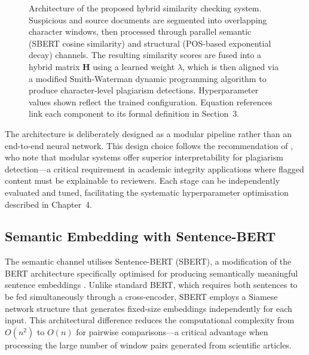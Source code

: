 \documentclass[12pt, a4paper]{article}
\begin{document}
\begin{figure}[htbp]
{%
	}%
	\caption{Architecture of the proposed hybrid similarity checking system. Suspicious and source documents are segmented into overlapping character windows, then processed through parallel semantic (SBERT cosine similarity) and structural (POS-based exponential decay) channels. The resulting similarity scores are fused into a hybrid matrix $\mathbf{H}$ using a learned weight $\lambda$, which is then aligned via a modified Smith-Waterman dynamic programming algorithm to produce character-level plagiarism detections. Hyperparameter values shown reflect the trained configuration. Equation references link each component to its formal definition in Section~3.}
	\label{fig:architecture}
\end{figure}

The architecture is deliberately designed as a modular pipeline rather than an end-to-end neural network. This design choice follows the recommendation of \citet{Sajid2025}, who note that modular systems offer superior interpretability for plagiarism detection---a critical requirement in academic integrity applications where flagged content must be explainable to reviewers. Each stage can be independently evaluated and tuned, facilitating the systematic hyperparameter optimisation described in Chapter~4.

\subsection{Semantic Embedding with Sentence-BERT}

The semantic channel utilises Sentence-BERT (SBERT), a modification of the BERT architecture specifically optimised for producing semantically meaningful sentence embeddings \citep{Reimers2019}. Unlike standard BERT, which requires both sentences to be fed simultaneously through a cross-encoder, SBERT employs a Siamese network structure that generates fixed-size embeddings independently for each input. This architectural difference reduces the computational complexity from $O(n^2)$ to $O(n)$ for pairwise comparisons---a critical advantage when processing the large number of window pairs generated from scientific articles.
\end{document}
